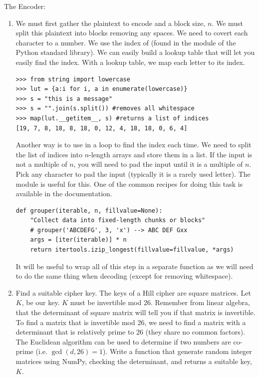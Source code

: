\begin{problem}
The Encoder:
\begin{enumerate}
\item We must first gather the plaintext to encode and a block size, $n$.
We must split this plaintext into blocks removing any spaces.  We need to covert each character to a number.
We use the index of  (found in the  module of the Python standard library).
We can easily build a lookup table that will let you easily find the index.
With a lookup table, we map each letter to its index.
\begin{lstlisting}
>>> from string import lowercase
>>> lut = {a:i for i, a in enumerate(lowercase)}
>>> s = "this is a message"
>>> s = "".join(s.split()) #removes all whitespace
>>> map(lut.__getitem__, s) #returns a list of indices
[19, 7, 8, 18, 8, 18, 0, 12, 4, 18, 18, 0, 6, 4]
\end{lstlisting}
Another way is to use  in a loop to find the index each time.
We need to split the list of indices into $n$-length arrays and store them in a list.
If the input is not a multiple of $n$, you will need to pad the input until it is a multiple of $n$.
Pick any character to pad the input (typically it is a rarely used letter).
The  module is useful for this.  One of the common recipes for doing this task is available in the  documentation.
\begin{lstlisting}
def grouper(iterable, n, fillvalue=None):
    "Collect data into fixed-length chunks or blocks"
    # grouper('ABCDEFG', 3, 'x') --> ABC DEF Gxx
    args = [iter(iterable)] * n
    return itertools.izip_longest(fillvalue=fillvalue, *args)
\end{lstlisting}
It will be useful to wrap all of this step in a separate function as we will need to do the same thing when decoding (except for removing whitespace).

\item Find a suitable cipher key.  The keys of a Hill cipher are square matrices.  Let $K$, be our key.
$K$ must be invertible mod 26.
Remember from linear algebra, that the determinant of square matrix will tell you if that matrix is invertible.
To find a matrix that is invertible mod 26, we need to find a matrix with a determinant that is relatively prime to 26 (they share no common factors).
The Euclidean algorithm can be used to determine if two numbers are co-prime (i.e. $\gcd(d, 26) = 1$).
Write a function that generate random integer matrices using NumPy, checking the determinant, and returns a suitable key, $K$.


\end{enumerate}
\end{problem}
